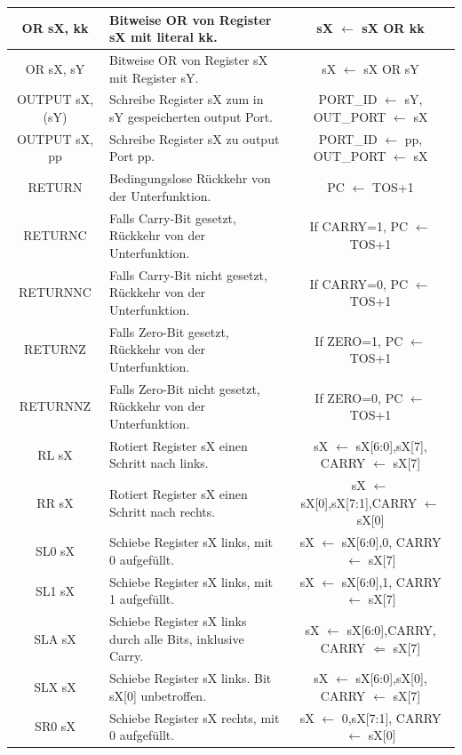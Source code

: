 \documentclass[bibliography=totoc,listof=totoc,index=totoc]{scrartcl}
\begin{document}
\begin{small}
\begin{longtable}{||c|p{6.5cm}|c||}
         OR sX, kk & Bitweise OR von Register sX mit literal kk. &sX $\leftarrow$ sX OR kk   \\ \hline
         OR sX, sY & Bitweise OR von Register sX mit Register sY. & sX $\leftarrow$ sX OR sY   \\ \hline
         OUTPUT sX, (sY) & Schreibe Register sX zum in sY gespeicherten output Port. &PORT\_ID $\leftarrow$ sY, OUT\_PORT $\leftarrow$ sX  \\ \hline
         OUTPUT sX, pp & Schreibe Register sX zu output Port pp. &PORT\_ID $\leftarrow$ pp, OUT\_PORT $\leftarrow$ sX  \\ \hline
         RETURN & Bedingungslose Rückkehr von der Unterfunktion. & PC $\leftarrow$ TOS+1  \\ \hline
         RETURNC & Falls Carry-Bit gesetzt, Rückkehr von der Unterfunktion. & If CARRY=1, PC $\leftarrow$ TOS+1 \\ \hline
         RETURNNC & Falls Carry-Bit nicht gesetzt, Rückkehr von der Unterfunktion. & If CARRY=0, PC $\leftarrow$ TOS+1 \\ \hline
         RETURNZ & Falls Zero-Bit gesetzt, Rückkehr von der Unterfunktion.& If ZERO=1, PC $\leftarrow$ TOS+1 \\ \hline
         RETURNNZ & Falls Zero-Bit nicht gesetzt, Rückkehr von der Unterfunktion. & If ZERO=0, PC $\leftarrow$ TOS+1  \\ \hline
         RL sX & Rotiert Register sX einen Schritt nach links. &sX $\leftarrow$ {sX[6:0],sX[7]}, CARRY $\leftarrow$ sX[7]  \\ \hline
         RR sX & Rotiert Register sX einen Schritt nach rechts. &sX $\leftarrow$ {sX[0],sX[7:1]},CARRY $\leftarrow$ sX[0]   \\ \hline
         SL0 sX & Schiebe Register sX links, mit 0 aufgefüllt. &sX $\leftarrow$ {sX[6:0],0}, CARRY $\leftarrow$ sX[7]  \\ \hline
         SL1 sX & Schiebe Register sX links, mit 1 aufgefüllt. &sX $\leftarrow$ {sX[6:0],1}, CARRY $\leftarrow$ sX[7]  \\ \hline
         SLA sX & Schiebe Register sX links durch alle Bits, inklusive Carry. &sX $\leftarrow$ {sX[6:0],CARRY}, CARRY $\Leftarrow$ sX[7]  \\ \hline
         SLX sX & Schiebe Register sX links. Bit sX[0] unbetroffen. &sX $\leftarrow$ {sX[6:0],sX[0]}, CARRY $\leftarrow$ sX[7]  \\ \hline
         SR0 sX & Schiebe Register sX rechts, mit 0 aufgefüllt. &sX $\leftarrow$ {0,sX[7:1]}, CARRY $\leftarrow$ sX[0]  \\ \hline

\end{longtable}
\end{small}
\end{document}
